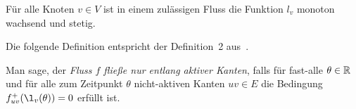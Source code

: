 \begin{lemma}
	Für alle Knoten $v\in V$ ist in einem zulässigen Fluss die Funktion $l_v$ monoton wachsend und stetig.
\end{lemma}

Die folgende Definition entspricht der Definition~2 aus~\cite{Koch2011}.

\begin{definition}
	Man sage, der \emph{Fluss $f$ fließe nur entlang aktiver Kanten}, falls für fast-alle $\theta\in\mathbb{R}$ und für alle zum Zeitpunkt $\theta$ nicht-aktiven Kanten $uv\in E$ die Bedingung
	$f_{uv}^+(\l_v(\theta)) = 0$ erfüllt ist.
\end{definition}

